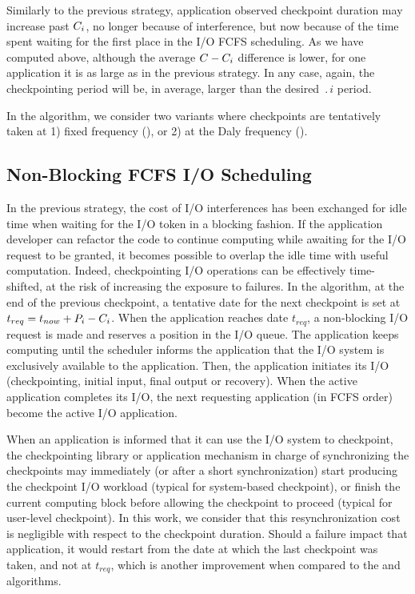 Similarly to the previous strategy, application observed checkpoint
duration may increase past $C_{i}$, no longer because of interference, but now because
of  the time spent waiting for the first place in the I/O FCFS scheduling.
As we have computed above, although the average $C-C_{i}$
difference is lower, for one application it is as large as in the
previous strategy. In any case, again, the checkpointing period will
be, in average, larger than the desired $\period{i}$ period.

In the \fifoblock algorithm, we consider two variants where checkpoints are
tentatively taken at 1) fixed frequency (\bfifofixed), or 2) at the
Daly frequency (\bfifodaly).

\subsection{Non-Blocking \fifononblock FCFS I/O Scheduling}
\label{sec:fcfsnonblock}

In the previous strategy, the cost of I/O interferences has been
exchanged for idle time when waiting for the I/O token in a blocking
fashion. If the application developer can refactor the code
to continue computing while awaiting for the I/O request to be granted,
it becomes possible to overlap the idle time with useful computation.
Indeed, checkpointing I/O operations can
be effectively time-shifted, at the risk of increasing the exposure to failures.
 In the \fifononblock algorithm, at the end of the previous checkpoint, a tentative
date for the next checkpoint is set at $t_{req}=t_{now}+P_{i}-C_{i}$.
When the application reaches date $t_{req}$, a non-blocking I/O request
is made and reserves a position in the
I/O queue. The application keeps computing until the
scheduler informs the application that the I/O system is exclusively
available to the application. Then, the application initiates its
I/O (checkpointing, initial input, final output or recovery). When the active application completes
its I/O, the next requesting application (in FCFS order)
become the active I/O application.

When an application is informed that it can use the I/O system to
checkpoint, the checkpointing library or application mechanism
in charge of synchronizing the checkpoints may immediately (or after
a short synchronization) start producing the checkpoint I/O workload
(typical for system-based checkpoint),
or finish the current computing block before allowing the checkpoint
to proceed (typical for user-level checkpoint). In this work, we consider
that this resynchronization cost is negligible with respect to the
checkpoint duration. Should a failure impact that application,
it would restart from the date at which the last checkpoint was taken, and
not at $t_{req}$, which is another improvement when compared to the
\fifoblock and \nocoop algorithms.

